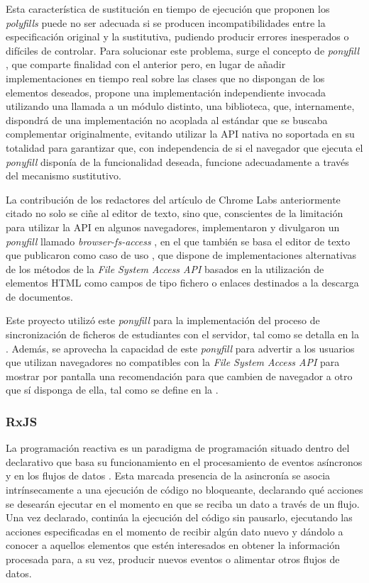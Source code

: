 Esta característica de sustitución en tiempo de ejecución que proponen los \textit{polyfills} puede no ser adecuada si se producen incompatibilidades entre la especificación original y la sustitutiva, pudiendo producir errores inesperados o difíciles de controlar. Para solucionar este problema, surge el concepto de \textit{ponyfill} \cite{Ponyfill}, que comparte finalidad con el anterior pero, en lugar de añadir implementaciones en tiempo real sobre las clases que no dispongan de los elementos deseados, propone una implementación independiente invocada utilizando una llamada a un módulo distinto, una biblioteca, que, internamente, dispondrá de una implementación no acoplada al estándar que se buscaba complementar originalmente, evitando utilizar la API nativa no soportada en su totalidad para garantizar que, con independencia de si el navegador que ejecuta el \textit{ponyfill} disponía de la funcionalidad deseada, funcione adecuadamente a través del mecanismo sustitutivo.

La contribución de los redactores del artículo de Chrome Labs anteriormente citado \cite{ArticuloChromeFsaAPI} no solo se ciñe al editor de texto, sino que, conscientes de la limitación para utilizar la API en algunos navegadores, implementaron y divulgaron un \textit{ponyfill} llamado \textit{browser-fs-access} \cite{BrowserFSAccess}, en el que también se basa el editor de texto que publicaron como caso de uso \cite{ChromeLabsEditor}, que dispone de implementaciones alternativas de los métodos de la \textit{File System Access API} basados en la utilización de elementos HTML como campos de tipo fichero o enlaces destinados a la descarga de documentos.

Este proyecto utilizó este \textit{ponyfill} para la implementación del proceso de sincronización de ficheros de estudiantes con el servidor, tal como se detalla en la . Además, se aprovecha la capacidad de este \textit{ponyfill} para advertir a los usuarios que utilizan navegadores no compatibles con la \textit{File System Access API} para mostrar por pantalla una recomendación para que cambien de navegador a otro que sí disponga de ella, tal como se define en la .

\subsubsection{RxJS}
\label{subsec:tecRxJS}
La programación reactiva es un paradigma de programación situado dentro del declarativo que basa su funcionamiento en el procesamiento de eventos asíncronos y en los flujos de datos \cite{ReactiveProgramming}. Esta marcada presencia de la asincronía se asocia intrínsecamente a una ejecución de código no bloqueante, declarando qué acciones se desearán ejecutar en el momento en que se reciba un dato a través de un flujo. Una vez declarado, continúa la ejecución del código sin pausarlo, ejecutando las acciones especificadas en el momento de recibir algún dato nuevo y dándolo a conocer a aquellos elementos que estén interesados en obtener la información procesada para, a su vez, producir nuevos eventos o alimentar otros flujos de datos.

